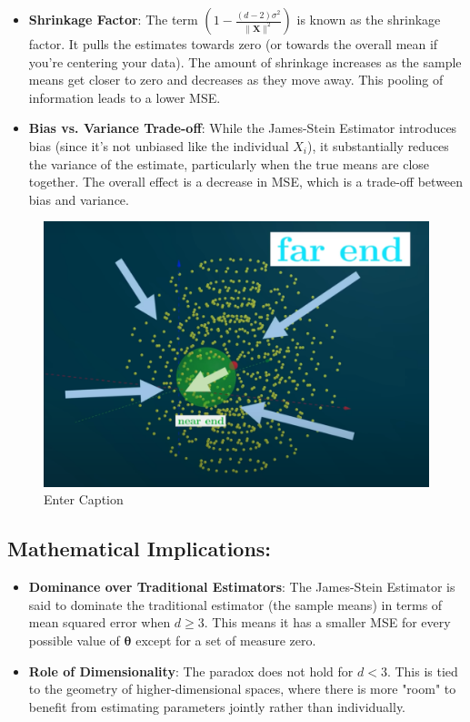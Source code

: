 \documentclass{article}
\begin{document}
\begin{itemize}
    \item \textbf{Shrinkage Factor}: The term \(\left(1 - \frac{(d-2) \sigma^2}{\|\boldsymbol{X}\|^2}\right)\) is known as the shrinkage factor. It pulls the estimates towards zero (or towards the overall mean if you're centering your data). The amount of shrinkage increases as the sample means get closer to zero and decreases as they move away. This pooling of information leads to a lower MSE.
    \item \textbf{Bias vs. Variance Trade-off}: While the James-Stein Estimator introduces bias (since it's not unbiased like the individual \(X_i\)), it substantially reduces the variance of the estimate, particularly when the true means are close together. The overall effect is a decrease in MSE, which is a trade-off between bias and variance.
\end{itemize}

\begin{figure}
    \centering
    \includegraphics[width=1\linewidth]{overviews/james-stein-estimator/figures/near_far_end.png}
    \caption{Enter Caption}
    \label{fig:enter-label}
\end{figure}

\subsection*{Mathematical Implications:}

\begin{itemize}
    \item \textbf{Dominance over Traditional Estimators}: The James-Stein Estimator is said to dominate the traditional estimator (the sample means) in terms of mean squared error when \(d \geq 3\). This means it has a smaller MSE for every possible value of \(\boldsymbol{\theta}\) except for a set of measure zero.
    \item \textbf{Role of Dimensionality}: The paradox does not hold for \(d < 3\). This is tied to the geometry of higher-dimensional spaces, where there is more "room" to benefit from estimating parameters jointly rather than individually.
\end{itemize}
\end{document}
